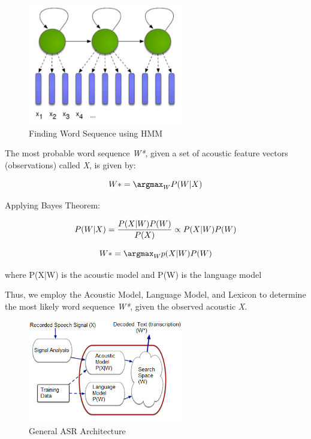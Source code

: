\begin{figure}[h!]
    \centering
    \includegraphics[width=0.6\textwidth]{img/TrASR.png}
    \caption{Finding Word Sequence using HMM}
    \label{fig:word-seq-HMM}
\end{figure}

The most probable word sequence \textit{W*}, given a set of acoustic feature vectors (observations) called \textit{X}, is given by:

\begin{equation}
    W*=\argmax_{W} P(W|X)
\end{equation}

Applying Bayes Theorem: 

\begin{equation*}
    P(W|X)=\frac{P(X|W)P(W)}{P(X)} \\
    \propto P(X|W)P(W) \\
\end{equation*}

\begin{equation}
    W*=\argmax_{W}p(X|W) P(W) \\
\end{equation}
    
where P(X|W) is the acoustic model and P(W) is the language model

Thus, we employ the Acoustic Model, Language Model, and Lexicon to determine the most likely word sequence \textit{W*}, given the observed acoustic \textit{X}.

\begin{figure}[h!]
    \centering
    \includegraphics[width=0.6\textwidth]{img/pXW.png}
    \caption{General ASR Architecture}
    \label{fig:basic_asr-arch}
\end{figure}


